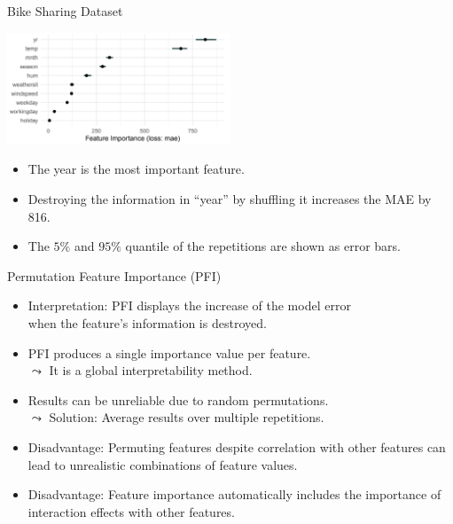 \documentclass[aspectratio=169]{../latex_main/tntbeamer}  %
\begin{document}
{\begin{itemize}
{\begin{itemize}
      \end{itemize}}
  \end{itemize}
}

\begin{frame}{Bike Sharing Dataset}

\begin{center}
\includegraphics[width=0.5\textwidth]{figure/bike-sharing02.png}
\end{center}

\begin{itemize}
 \item The year is the most important feature.
 \item Destroying the information in ``year'' by shuffling it increases the MAE by 816.
 \item The $5 \%$ and $95 \%$ quantile of the repetitions are shown as error bars.
\end{itemize}
\end{frame}

\begin{frame}{Permutation Feature Importance (PFI)}
 \begin{itemize}
 \itemsep1em
  \item Interpretation: PFI displays the increase of the model error\\ when the feature's information is destroyed.
  \pause
  \item PFI produces a single importance value per feature. \\
  $\leadsto$ It is a global interpretability method.
  \pause
  \item Results can be unreliable due to random permutations. \\
  $\leadsto$ Solution: Average results over multiple repetitions.
  \pause
  \item Disadvantage: Permuting features despite correlation with other features can lead to unrealistic combinations of feature values.
  \pause
  \item Disadvantage: Feature importance automatically includes the importance of interaction effects with other features.
 \end{itemize}
\end{frame}
\end{document}
